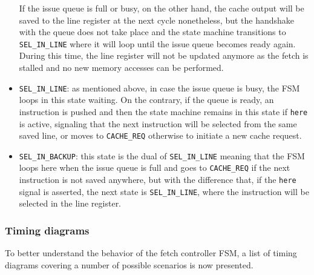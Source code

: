\begin{itemize}
  If the issue queue is full or busy, on the other hand, the cache output will be saved to the line register at the next cycle nonetheless, but the handshake with the queue does not take place and the state machine transitions to \texttt{SEL\_IN\_LINE} where it will loop until the issue queue becomes ready again. During this time, the line register will not be updated anymore as the fetch is stalled and no new memory accesses can be performed. 
  \item \texttt{SEL\_IN\_LINE}: as mentioned above, in case the issue queue is busy, the \acs{FSM} loops in this state waiting. On the contrary, if the queue is ready, an instruction is pushed and then the state machine remains in this state if \texttt{here} is active, signaling that the next instruction will be selected from the same saved line, or moves to \texttt{CACHE\_REQ} otherwise to initiate a new cache request.
  \item \texttt{SEL\_IN\_BACKUP}: this state is the dual of \texttt{SEL\_IN\_LINE} meaning that the \acs{FSM} loops here when the issue queue is full and goes to \texttt{CACHE\_REQ} if the next instruction is not saved anywhere, but with the difference that, if the \texttt{here} signal is asserted, the next state is \texttt{SEL\_IN\_LINE}, where the instruction will be selected in the line register.
\end{itemize}

\subsubsection{Timing diagrams}
To better understand the behavior of the fetch controller \acs{FSM}, a list of timing diagrams covering a number of possible scenarios is now presented.

